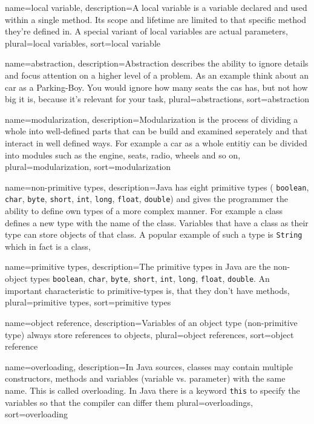 {
	name=local variable,
	description={A local variable is a variable declared and used within a
		single method. Its scope and lifetime are limited to that
		specific method they're defined in. A special variant of local
		variables are actual parameters},
	plural=local variables,
	sort=local variable
}

{
	name=abstraction,
	description={Abstraction describes the ability to ignore details and
		focus attention on a higher level of a problem. As an example
		think about an car as a Parking-Boy. You would ignore how
		many seats the cas has, but not how big it is, because it's
		relevant for your task},
	plural=abstractions,
	sort=abstraction
}

{
	name=modularization,
	description={Modularization is the process of dividing a whole into
		well-defined parts that can be build and examined seperately
		and that interact in well defined ways. For example a car as
		a whole entitiy can be divided into modules such as the
		engine, seats, radio, wheels and so on},
	plural=modularization,
	sort=modularization
}

{
	name=non-primitive types,
	description={Java has eight primitive types (
		\lstinline?boolean?, \lstinline?char?,
		\lstinline?byte?, \lstinline?short?, \lstinline?int?, 
		\lstinline?long?, \lstinline?float?, \lstinline?double?) and
		gives the programmer the ability to define own types of a
		more complex manner. For example a class defines a new type 
		with the name of the class. Variables that have a class as
		their type can store objects of that class. A popular 
		example of such a type is \lstinline?String? which in fact
		is a class},
}

{
	name=primitive types,
	description={The primitive types in Java are the non-object types
		\lstinline?boolean?, \lstinline?char?,
		\lstinline?byte?, \lstinline?short?, \lstinline?int?, 
		\lstinline?long?, \lstinline?float?, \lstinline?double?.
		An important characteristic to primitive-types is, that they
		don't have methods},
	plural=primitive types,
	sort=primitive types
}

{
	name=object reference,
	description={Variables of an object type (non-primitive type) always
		store references to objects},
	plural=object references,
	sort=object reference
}

{
	name=overloading,
	description={In Java sources, classes may contain multiple constructors,
		methods and variables (variable vs. parameter) with the same 
		name. This is called overloading. In Java there is a keyword 
		\lstinline?this? to
		specify the variables so that the compiler can differ them}
	plural=overloadings,
	sort=overloading
}

